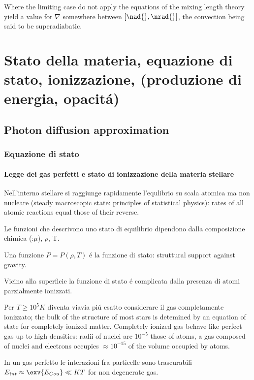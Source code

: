 \documentclass[oneside,12pt,fleqn]{memoir}
\begin{document}
Where the limiting case do not apply the equations of the mixing length theory yield a value for $\nabla$ somewhere between $[\nad{},\nrad{}]$, the convection being said to be superadiabatic.



\part{Stato della materia, equazione di stato, ionizzazione, (produzione di energia, opacit\'a)}

\chapter{Photon diffusion approximation} \label{chap:stellarinterior}
\PartialToc





\section{Equazione di stato}

\subsection{Legge dei gas perfetti e stato di ionizzazione della materia stellare}

Nell'interno stellare si raggiunge rapidamente l'equlibrio su scala atomica ma non nucleare (steady macroscopic state: principles of statistical physics): rates of all atomic reactions equal those of their reverse.

Le funzioni che descrivono uno stato di equilibrio dipendono dalla composizione chimica (:$\mu$), $\rho$, T.

Una funzione $P=P(\rho,T)$ \'e la funzione di stato: struttural support against gravity.

Vicino alla superficie la funzione di stato \'e complicata dalla presenza di atomi parzialmente ionizzati.

Per $T\geq 10^5 K$ diventa viavia pi\'u esatto considerare il gas completamente ionizzato; the bulk of the structure of most stars is detemined by an equation of state for completely ionized matter. Completely ionized gas behave like perfect gas up to high densities: radii of nuclei are $10^{-5}$ those of atoms, a gas composed of nuclei and electrons occupies $\approx10^{-15}$ of the volume occupied by atoms.

In un gas perfetto le interazioni fra particelle sono trascurabili $E_{int}\approx\exv{E_{Cou}}\ll KT$ for non degenerate gas.
\end{document}
